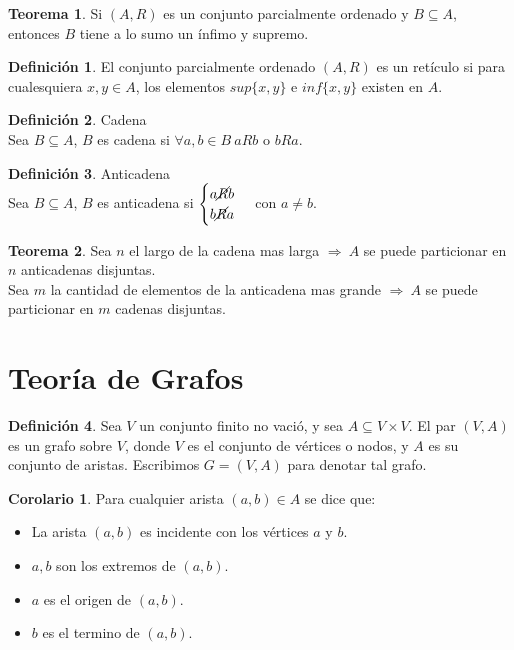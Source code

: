 \documentclass[10pt]{article}
\theoremstyle{definition}
\newtheorem{definition}{Definición}[section]
\newtheorem{theorem}{Teorema}[section]
\newtheorem{corollary}{Corolario}[theorem]
\begin{document}
    \begin{theorem}
        Si $(A,R)$ es un conjunto parcialmente ordenado y $B\subseteq A$, entonces $B$ tiene a lo sumo un ínfimo y supremo.
    \end{theorem}
    \begin{definition}
        El conjunto parcialmente ordenado $(A,R)$ es un retículo si para cualesquiera $x,y\in A$, los elementos $sup\{x,y\}$ e $inf\{x,y\}$ existen en $A$.
    \end{definition}
    \begin{definition}{Cadena}
        \\Sea $B\subseteq A$, $B$ es cadena si $\forall a,b\in B\ aRb$ o $bRa$.
    \end{definition}
    \begin{definition}{Anticadena}
        \\Sea $B\subseteq A$, $B$ es anticadena si $\begin{cases} a\cancel{R}b\\b\cancel{R}a\end{cases}$ con $a\neq b$.
    \end{definition}
    \begin{theorem}
        Sea $n$ el largo de la cadena mas larga $\Rightarrow\ A$ se puede particionar en $n$ anticadenas disjuntas.\\
        Sea $m$ la cantidad de elementos de la anticadena mas grande $\Rightarrow\ A$ se puede particionar en $m$ cadenas disjuntas.
    \end{theorem}
    \newpage\section{Teoría de Grafos}
    \begin{definition}
        Sea $V$ un conjunto finito no vació, y sea $A\subseteq V\times V$. El par $(V,A)$ es un grafo sobre $V$, donde $V$ es el conjunto de vértices o nodos, y $A$ es su conjunto de aristas. Escribimos $G=(V,A)$ para denotar tal grafo.
    \end{definition}
    \begin{corollary}
        Para cualquier arista $(a,b)\in A$ se dice que:
        \begin{itemize}
            \item La arista $(a,b)$ es incidente con los vértices $a$ y $b$.
            \item $a,b$ son los extremos de $(a,b)$.
            \item $a$ es el origen de $(a,b)$.
            \item $b$ es el termino de $(a,b)$.
        \end{itemize}
    \end{corollary}
\end{document}
